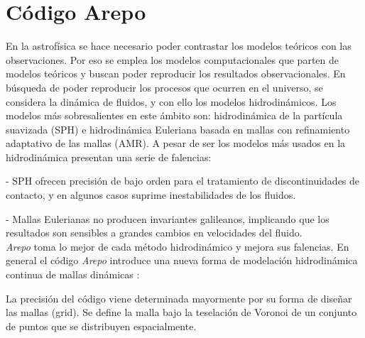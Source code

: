 \section{Código Arepo}
\label{sec: codigo arepo}


En la astrofísica se hace necesario poder contrastar los modelos teóricos con las observaciones. Por eso se emplea los modelos computacionales que parten de  modelos teóricos y buscan poder reproducir los resultados observacionales. En búsqueda de poder reproducir los procesos que ocurren en el universo, se considera la dinámica de fluidos, y con ello los modelos hidrodinámicos. Los modelos más sobresalientes en este ámbito son: hidrodinámica de la partícula suavizada (SPH) \cite{monaghan1992} e hidrodinámica Euleriana basada en mallas \cite{stone2008} con refinamiento adaptativo de las mallas (AMR). A pesar de ser los modelos más usados en la hidrodinámica presentan una serie de falencias:

- SPH ofrecen precisión de bajo orden para el tratamiento de discontinuidades de contacto, y en algunos casos suprime inestabilidades de los fluidos.

- Mallas Eulerianas no producen invariantes galileanos, implicando que los resultados son sensibles a grandes cambios en velocidades del fluido.\\

{\it{Arepo}} toma lo mejor de cada método hidrodinámico y mejora sus falencias. En general el código {\it{Arepo}} introduce una nueva forma de modelación hidrodinámica continua de mallas dinámicas \cite{springel2010}:

La precisión del código viene determinada mayormente por su forma de diseñar las mallas (grid). Se define la malla bajo la teselación de Voronoi de un conjunto de puntos que se distribuyen espacialmente.

